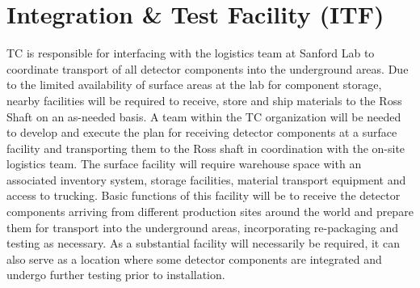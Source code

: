\section{Integration \& Test Facility (ITF)}
\label{sec:fdsp-coord-integ-test}

 TC is responsible for interfacing with the  
logistics team at Sanford Lab to coordinate transport of all detector
components into the underground areas.  Due to the limited availability 
of surface areas at the lab for component storage, nearby facilities 
will be required to receive, store and ship materials to the Ross Shaft 
on an as-needed basis. A team within the TC organization will be needed 
to develop and execute the plan for receiving detector components at a 
surface facility and transporting them to the Ross shaft in coordination 
with the on-site  logistics team.  The surface facility will 
require warehouse space with an associated inventory system, storage 
facilities, material transport equipment and access to trucking.  Basic 
functions of this facility will be to receive the detector components 
arriving from different production sites around the world and prepare 
them for transport into the underground areas, incorporating re-packaging 
and testing as necessary. As a substantial facility will necessarily be 
required, it can also serve as a location where some detector components 
are integrated and undergo further testing prior to installation.  

